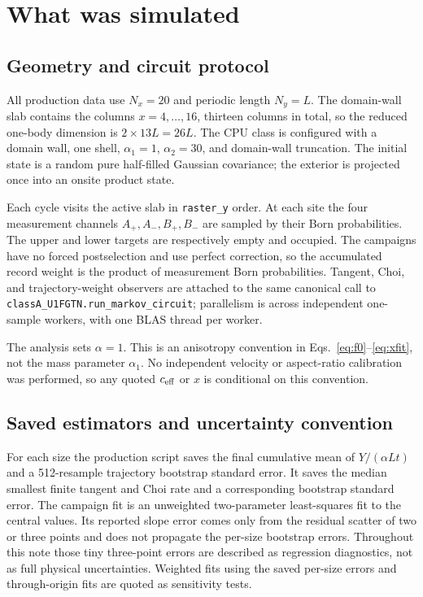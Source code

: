 \documentclass[aps,prb,onecolumn,nofootinbib,superscriptaddress]{revtex4-2}
\begin{document}
\section{What was simulated}

\subsection{Geometry and circuit protocol}

All production data use $N_x=20$ and periodic length $N_y=L$.  The domain-wall slab contains
the columns $x=4,\ldots,16$, thirteen columns in total, so the reduced one-body dimension is
$2\times13L=26L$.  The CPU class is configured with a domain wall, one shell,
$\alpha_1=1$, $\alpha_2=30$, and domain-wall truncation.  The initial state is a random pure
half-filled Gaussian covariance; the exterior is projected once into an onsite product
state.

Each cycle visits the active slab in \texttt{raster\_y} order.  At each site the four
measurement channels $A_+,A_-,B_+,B_-$ are sampled by their Born probabilities.  The upper
and lower targets are respectively empty and occupied.  The campaigns have no forced
postselection and use perfect correction, so the accumulated record weight is the product
of measurement Born probabilities.  Tangent, Choi, and trajectory-weight observers are
attached to the same canonical call to
\texttt{classA\_U1FGTN.run\_markov\_circuit}; parallelism is across independent one-sample
workers, with one BLAS thread per worker.

The analysis sets $\alpha=1$.  This is an anisotropy convention in
Eqs.~\eqref{eq:f0}--\eqref{eq:xfit}, not the mass parameter $\alpha_1$.  No independent
velocity or aspect-ratio calibration was performed, so any quoted $c_{\rm eff}$ or $x$ is
conditional on this convention.

\subsection{Saved estimators and uncertainty convention}

For each size the production script saves the final cumulative mean of $Y/(\alpha Lt)$ and a
512-resample trajectory bootstrap standard error.  It saves the median smallest finite
tangent and Choi rate and a corresponding bootstrap standard error.  The campaign fit is an
unweighted two-parameter least-squares fit to the central values.  Its reported slope error
comes only from the residual scatter of two or three points and does not propagate the
per-size bootstrap errors.  Throughout this note those tiny three-point errors are described
as regression diagnostics, not as full physical uncertainties.  Weighted fits using the
saved per-size errors and through-origin fits are quoted as sensitivity tests.
\end{document}
